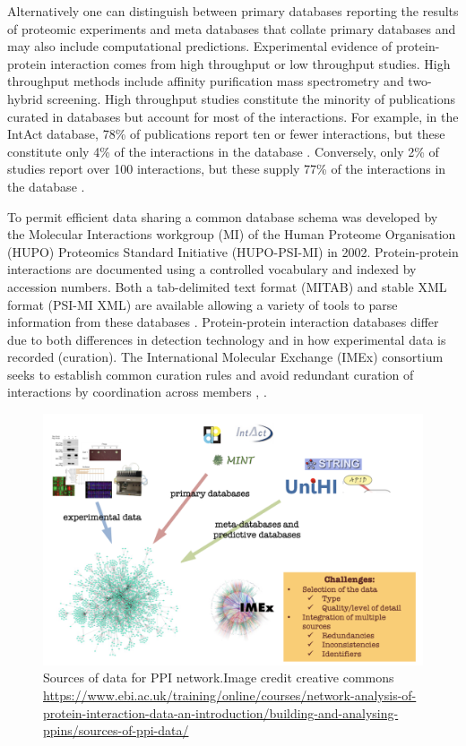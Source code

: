  Alternatively one can distinguish between primary databases reporting the results of proteomic experiments and  meta databases that collate primary databases and may also include computational predictions\cite{dong2018analyses}. Experimental evidence of protein-protein interaction comes from high throughput or low throughput studies. High throughput methods include affinity purification mass spectrometry and two-hybrid screening\cite{dong2018analyses}. High throughput studies constitute the minority of publications curated in databases but account for most of the interactions. For example, in the IntAct database\cite{hermjakob2004intact}, 78\% of publications report ten or fewer interactions, but these constitute only 4\% of the interactions in the database \cite{dong2018analyses}. Conversely, only 2\% of studies report over 100 interactions, but these supply 77\% of the interactions in the database \cite{dong2018analyses}. 
 
 To permit efficient data sharing a common database schema was developed by the Molecular Interactions workgroup (MI) of the Human Proteome Organisation (HUPO) Proteomics Standard Initiative (HUPO-PSI-MI) in 2002. Protein-protein interactions are documented using a controlled vocabulary and indexed by accession numbers\cite{orchard2012molecular}. Both a tab-delimited text format (MITAB) and stable XML format (PSI-MI XML) are available allowing a variety of tools to parse information from these databases \cite{orchard2012molecular}.  Protein-protein interaction databases differ due to both differences in detection technology and in how experimental data is recorded (curation). The International Molecular Exchange (IMEx) consortium seeks to establish common curation rules and avoid redundant curation of interactions by coordination across members \cite{orchard2012molecular}, \cite{orchard2012protein}.
 
 \begin{figure}
     \centering
     \includegraphics[width=\textwidth]{images/chapter_community_detection/mac/getting_data.png}
     \caption{Sources of data for PPI network.Image credit creative commons \url{https://www.ebi.ac.uk/training/online/courses/network-analysis-of-protein-interaction-data-an-introduction/building-and-analysing-ppins/sources-of-ppi-data/}}
     
     \label{fig:sources of data for PPI network}
 \end{figure}

